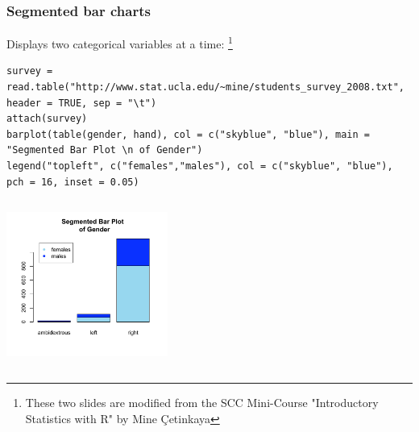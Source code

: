 \begin{frame}
  \frametitle{Segmented bar charts}

Displays two categorical variables at a time: \footnote{These two slides are modified from the SCC Mini-Course "Introductory Statistics with R" by Mine \c{C}etinkaya}

\tiny
\begin{lstlisting}
survey = read.table("http://www.stat.ucla.edu/~mine/students_survey_2008.txt", header = TRUE, sep = "\t")
attach(survey)
barplot(table(gender, hand), col = c("skyblue", "blue"), main = "Segmented Bar Plot \n of Gender")
legend("topleft", c("females","males"), col = c("skyblue", "blue"), pch = 16, inset = 0.05)
\end{lstlisting}

\newpage
    \begin{columns}
      
       \begin{center}
\includegraphics[width = 53mm]{images/segbarplot.pdf}
\end{center}

\begin{center}
\end{center}
\normalsize
\end{columns}

\end{frame}

